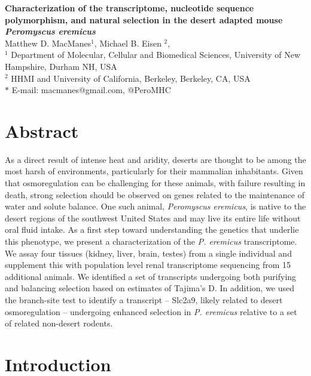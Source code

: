 \documentclass[12pt]{article}
\date{}
\newcommand{\peer}{\textit{P. eremicus}}
\begin{document}
\begin{flushleft}
{\Large
\textbf{Characterization of the transcriptome, nucleotide sequence polymorphism, and natural selection in the desert adapted mouse \textit{Peromyscus eremicus}}
}
\\
Matthew D. MacManes$^{1}$, 
Michael B. Eisen $^{2}$, 
\\
$^{1}$ Department of Molecular, Cellular and Biomedical Sciences, University of New Hampshire, Durham NH, USA
\\
$^{2}$ HHMI and University of California, Berkeley, Berkeley, CA, USA
\\
$\ast$ E-mail: macmanes@gmail.com, @PeroMHC
\end{flushleft}

\linenumbers

\section*{Abstract}

As a direct result of intense heat and aridity, deserts are thought to be among the most harsh of environments, particularly for their mammalian inhabitants. Given that osmoregulation can be challenging for these animals, with failure resulting in death, strong selection should be observed on genes related to the maintenance of water and solute balance. One such animal, \textit{Peromyscus eremicus}, is native to the desert regions of the southwest United States and may live its entire life without oral fluid intake. As a first step toward understanding the genetics that underlie this phenotype, we present a characterization of the \peer\: transcriptome. We assay four tissues (kidney, liver, brain, testes) from a single individual and supplement this with population level renal transcriptome sequencing from 15 additional animals. We identified a set of transcripts undergoing both purifying and balancing selection based on estimates of Tajima's D. In addition, we used the branch-site test to identify a transcript -- Slc2a9, likely related to desert osmoregulation -- undergoing enhanced selection in \peer\: relative to a set of related non-desert rodents.  \\


\section*{Introduction}
\end{document}
